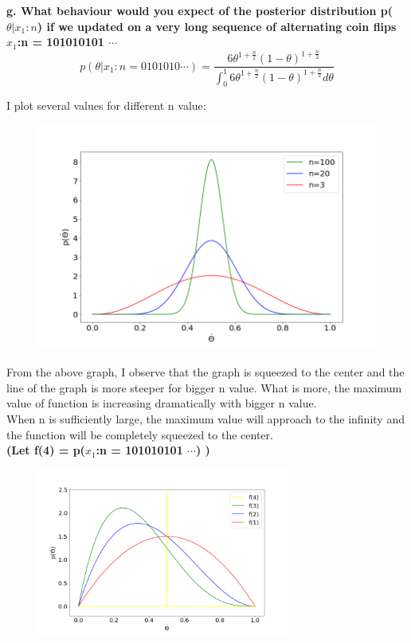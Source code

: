 \documentclass{article}
\begin{document}
\textbf{g. What behaviour would you expect of the posterior distribution p($\theta|x_1:n$) if we updated on a very long sequence of alternating coin flips $x_1$:n = 101010101 $\cdots$}\\
\[
p(\theta|x_1:n = 0101010\cdots) = \frac{6\theta^{1+\frac{n}{2}}(1-\theta)^{1+\frac{n}{2}}}{\int_0^{1}{6\theta^{1+\frac{n}{2}}(1-\theta)^{1+\frac{n}{2}}}d\theta}
\]

I plot several values for different n value:\\

\begin{figure}[H]
\centering
\includegraphics[width = \linewidth]{2.png}
\end{figure}

From the above graph, I observe that the graph is squeezed to the center and the line of the graph is more steeper for bigger n value. What is more, the maximum value of function is increasing dramatically with bigger n value. \\

When n is sufficiently large, the maximum value will approach to the infinity and the function will be completely squeezed to the center.\\\textbf{(Let f(4) = p($x_1$:n = 101010101 $\cdots$) )}
\begin{figure}[H]
\centering
\includegraphics[width = \linewidth,height = 210px]{3.png}
\end{figure}
\end{document}
